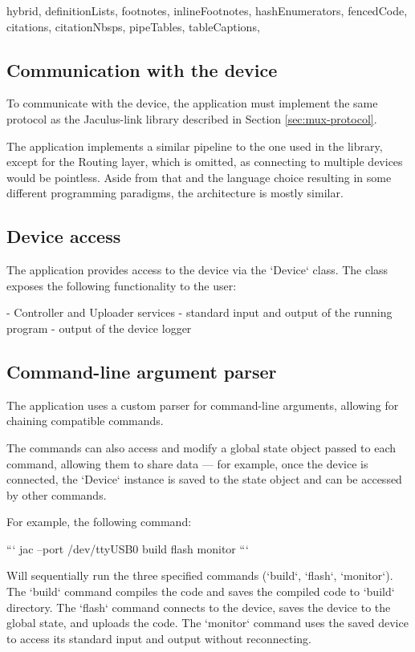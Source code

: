 \begin{markdown*}{%
  hybrid,
  definitionLists,
  footnotes,
  inlineFootnotes,
  hashEnumerators,
  fencedCode,
  citations,
  citationNbsps,
  pipeTables,
  tableCaptions,
}
\subsection{Communication with the device}

To communicate with the device, the application must implement the same protocol as the Jaculus-link library described in Section \ref{sec:mux-protocol}.

The application implements a similar pipeline to the one used in the library, except for the Routing layer, which is omitted, as connecting to multiple devices would be pointless. Aside from that and the language choice resulting in some different programming paradigms, the architecture is mostly similar.

\subsection{Device access}

The application provides access to the device via the `Device` class. The class exposes the following functionality to the user:

  - Controller and Uploader services
  - standard input and output of the running program
  - output of the device logger

\subsection{Command-line argument parser}

The application uses a custom parser for command-line arguments, allowing for chaining compatible commands.

The commands can also access and modify a global state object passed to each command, allowing them to share data --- for example, once the device is connected, the `Device` instance is saved to the state object and can be accessed by other commands.

For example, the following command:

```
jac --port /dev/ttyUSB0 build flash monitor
```

Will sequentially run the three specified commands (`build`, `flash`, `monitor`). The `build` command compiles the code and saves the compiled code to `build` directory. The `flash` command connects to the device, saves the device to the global state, and uploads the code. The `monitor` command uses the saved device to access its standard input and output without reconnecting.


\end{markdown*}
